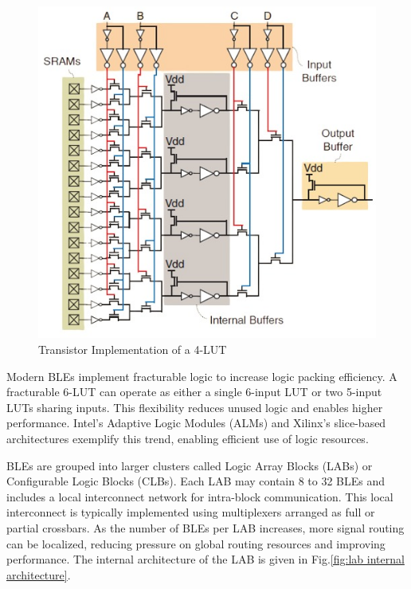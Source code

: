 \begin{figure}
	\centerline{\includegraphics[scale = 0.6]{Figures/4-LUT-Transistor.jpg}}
	\caption{Transistor Implementation of a 4-LUT\cite{boutros2021fpga}}
	\label{fig:4-lut transistor}
\end{figure}

Modern BLEs implement fracturable logic to increase logic packing efficiency\cite{funda-fpga-arch-1}. A fracturable 6-LUT can operate as either a single 6-input LUT or two 5-input LUTs sharing inputs\cite{stratix2007stratix}. This flexibility reduces unused logic and enables higher performance. Intel's Adaptive Logic Modules (ALMs) and Xilinx's slice-based architectures exemplify this trend, enabling efficient use of logic resources.

BLEs are grouped into larger clusters called Logic Array Blocks (LABs) or Configurable Logic Blocks (CLBs). Each LAB may contain 8 to 32 BLEs and includes a local interconnect network for intra-block communication. This local interconnect is typically implemented using multiplexers arranged as full or partial crossbars\cite{funda-fpga-arch-2}\cite{funda-fpga-arch-3}. As the number of BLEs per LAB increases, more signal routing can be localized, reducing pressure on global routing resources and improving performance. The internal architecture of the LAB is given in Fig.\ref{fig:lab internal architecture}.


